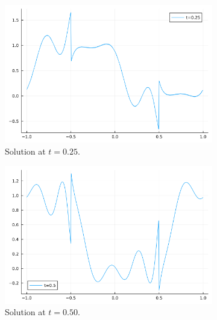 \documentclass[12pt]{report}
\begin{document}
\begin{solution}
\begin{enumerate}
        \begin{figure}[H]
            \begin{subfigure}[b]{0.45\linewidth}
                \centering
                \includegraphics[width=\linewidth]{images/1-1.png}
                \caption{Solution at $t=0.25$.}
                \label{fig1:a}
                \vspace{4ex}
            \end{subfigure}%
            \begin{subfigure}[b]{0.45\linewidth}
                \centering
                \includegraphics[width=\linewidth]{images/1-2.png}
                \caption{Solution at $t=0.50$.}
                \label{fig1:b}
                \vspace{4ex}
            \end{subfigure}
            \begin{subfigure}[b]{0.45\linewidth}

\end{subfigure}
\end{figure}
\end{enumerate}
\end{solution}
\end{document}

